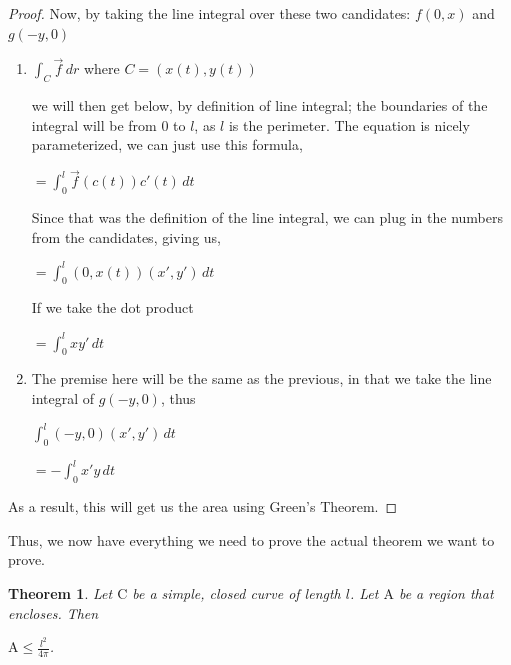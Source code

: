 \documentclass[a4paper]{book}
\newtheorem{theorem}{Theorem}%
\numberwithin{theorem}{section}%
\begin{document}
\begin{proof}
	Now, by taking the line integral over these two candidates: $f(0,x)$ and $g(-y,0)$
	\begin{enumerate}
		\item
			$\int_{C} \overrightarrow{f} \,dr$ \;\;\;where\; $C=(x(t),y(t))$

            we will then get below, by definition of line integral; the boundaries of the integral will be from $0$ to $l$, as $l$ is the perimeter. The equation is nicely parameterized, we can just use this formula,
            \begin{center}
                $\displaystyle =\int_{0}^{l} \overrightarrow{f}(c(t))c'(t) \,dt$
            \end{center}

            Since that was the definition of the line integral, we can plug in the numbers from the candidates, giving us,
            \begin{center}
                $\displaystyle = \int_{0}^{l} (0,x(t))(x',y') \,dt$
            \end{center}

            If we take the dot product
			\begin{center}
                $\displaystyle = \int_{0}^{l} xy' \,dt$
            \end{center}
			
		\item
            The premise here will be the same as the previous, in that we take the line integral of $g(-y,0)$, thus
            \begin{center}
                $\displaystyle \int_{0}^{l} (-y,0)(x',y') \,dt$

                $\displaystyle =-\int_{0}^{l} x'y \,dt$
            \end{center}
	\end{enumerate}
    As a result, this will get us the area using Green's Theorem. 
\end{proof}
Thus, we now have everything we need to prove the actual theorem we want to prove.
\newpage
\begin{theorem}
    Let $\mathrm{C}$ be a simple, closed curve of length $l$. Let $\mathrm{A}$ be a region that encloses. Then
    \begin{center}
        $\displaystyle \mathrm{A}\leq\frac{l^2}{4\pi}$.
    \end{center}
\end{theorem}
\end{document}

